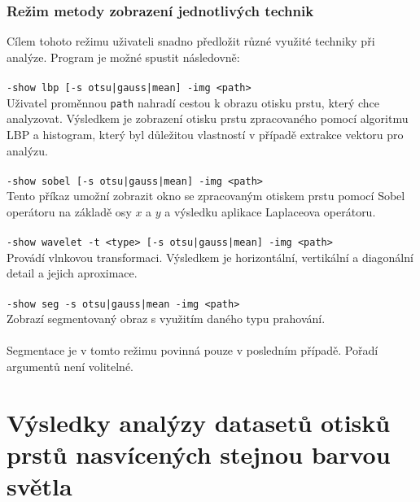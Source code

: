 \subsection*{Režim metody zobrazení jednotlivých technik}
Cílem tohoto režimu uživateli snadno předložit různé využité techniky při analýze. Program je možné spustit následovně:\\\\
\verb=-show lbp [-s otsu|gauss|mean] -img <path>=\\
Uživatel proměnnou \verb=path= nahradí cestou k obrazu otisku prstu, který chce analyzovat. Výsledkem je zobrazení otisku prstu zpracovaného pomocí algoritmu LBP a histogram, který byl důležitou vlastností v případě extrakce vektoru pro analýzu.\\\\
\verb=-show sobel [-s otsu|gauss|mean] -img <path>=\\
Tento příkaz umožní zobrazit okno se zpracovaným otiskem prstu pomocí Sobel operátoru na základě osy $x$ a $y$ a výsledku aplikace Laplaceova operátoru.\\\\
\verb=-show wavelet -t <type> [-s otsu|gauss|mean] -img <path>=\\
Provádí vlnkovou transformaci. Výsledkem je horizontální, vertikální a diagonální detail a jejich aproximace.\\\\
\verb=-show seg -s otsu|gauss|mean -img <path>=\\
Zobrazí segmentovaný obraz s využitím daného typu prahování.\\\\
Segmentace je v tomto režimu povinná pouze v posledním případě. Pořadí argumentů není volitelné.




\chapter{Výsledky analýzy datasetů otisků prstů nasvícených stejnou barvou světla}

